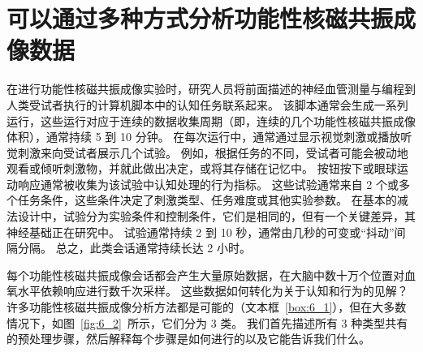 \section{可以通过多种方式分析功能性核磁共振成像数据}

在进行功能性核磁共振成像实验时，研究人员将前面描述的神经血管测量与编程到人类受试者执行的计算机脚本中的认知任务联系起来。
该脚本通常会生成一系列运行，这些运行对应于连续的数据收集周期（即，连续的几个功能性核磁共振成像体积），通常持续 5 到 10 分钟。 
在每次运行中，通常通过显示视觉刺激或播放听觉刺激来向受试者展示几个试验。 
例如，根据任务的不同，受试者可能会被动地观看或倾听刺激物，并就此做出决定，或将其存储在记忆中。 
按钮按下或眼球运动响应通常被收集为该试验中认知处理的行为指标。 
这些试验通常来自 2 个或多个任务条件，这些条件决定了刺激类型、任务难度或其他实验参数。
在基本的减法设计中，试验分为实验条件和控制条件，它们是相同的，但有一个关键差异，其神经基础正在研究中。 
试验通常持续 2 到 10 秒，通常由几秒的可变或“抖动”间隔分隔。 
总之，此类会话通常持续长达 2 小时。


每个功能性核磁共振成像会话都会产生大量原始数据，在大脑中数十万个位置对血氧水平依赖响应进行数千次采样。 
这些数据如何转化为关于认知和行为的见解？ 
许多功能性核磁共振成像分析方法都是可能的（文本框~\ref{box:6_1}），但在大多数情况下，如图~\ref{fig:6_2}~所示，它们分为 3 类。
我们首先描述所有 3 种类型共有的预处理步骤，然后解释每个步骤是如何进行的以及它能告诉我们什么。



